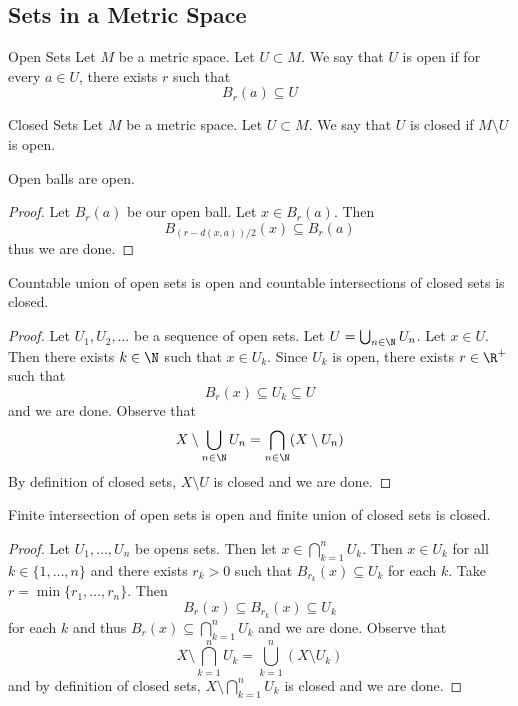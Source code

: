 \subsection{Sets in a Metric Space}
\begin{defn}{Open Sets}{} Let $M$ be a metric space. Let $U\subset M$. We say that $U$ is open if for every $a\in U$, there exists $r$ such that $$B_r(a)\subseteq U$$
\end{defn}

\begin{defn}{Closed Sets}{} Let $M$ be a metric space. Let $U\subset M$. We say that $U$ is closed if $M\setminus U$ is open. 
\end{defn}

\begin{lmm}{}{} Open balls are open. \tcbline
\begin{proof} Let $B_r(a)$ be our open ball. Let $x\in B_r(a)$. Then $$B_{(r-d(x,a))/2}(x)\subseteq B_r(a)$$ thus we are done. 
\end{proof}
\end{lmm}

\begin{prp}{}{} Countable union of open sets is open and countable intersections of closed sets is closed. \tcbline
\begin{proof} Let $U_1,U_2,\dots$ be a sequence of open sets. Let $U=\bigcup_{n\in\N}U_n$. Let $x\in U$. Then there exists $k\in\N$ such that $x\in U_k$. Since $U_k$ is open, there exists $r\in\R^+$ such that $$B_r(x)\subseteq U_k\subseteq U$$ and we are done. \linebreak\linebreak
Observe that $$X\setminus\bigcup_{n\in\N}U_n=\bigcap_{n\in\N}(X\setminus U_n)$$ By definition of closed sets, $X\setminus U$ is closed and we are done. 
\end{proof}
\end{prp}

\begin{prp}{}{} Finite intersection of open sets is open and finite union of closed sets is closed. \tcbline
\begin{proof}
Let $U_1,\dots,U_n$ be opens sets. Then let $x\in\bigcap_{k=1}^nU_k$. Then $x\in U_k$ for all $k\in\{1,\dots,n\}$ and there exists $r_k>0$ such that $B_{r_k}(x)\subseteq U_k$ for each $k$. Take $r=\min\{r_1,\dots,r_n\}$. Then $$B_r(x)\subseteq B_{r_k}(x)\subseteq U_k$$ for each $k$ and thus $B_r(x)\subseteq\bigcap_{k=1}^nU_k$ and we are done. \linebreak\linebreak
Observe that $$X\setminus\bigcap_{k=1}^nU_k=\bigcup_{k=1}^n(X\setminus U_k)$$ and by definition of closed sets, $X\setminus\bigcap_{k=1}^nU_k$ is closed and we are done. 
\end{proof}
\end{prp}

